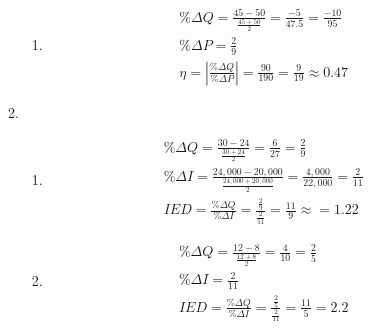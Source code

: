 \documentclass{article}
\begin{document}
\begin{enumerate}
\begin{enumerate}
\begin{enumerate}
		\item
		\begin{gather*}
		\% \Delta Q = \frac{45 - 50}{\frac{45 + 50}{2}} = \frac{-5}{47.5} = \frac{-10}{95} \\
		\% \Delta P = \frac{2}{9} \\
		\eta = \left| \frac{\% \Delta Q}{\% \Delta P} \right| = \frac{90}{190} = \frac{9}{19} \approx 0.47
		\end{gather*}
		
		\end{enumerate}
	
	\item
	
		\begin{enumerate}
		
		\item
		\begin{gather*}
		\% \Delta Q = \frac{30 - 24}{\frac{30 + 24}{2}} = \frac{6}{27} = \frac{2}{9} \\
		\% \Delta I = \frac{24,000 - 20,000}{\frac{24,000 + 20,000}{2}} = \frac{4,000}{22,000} = \frac{2}{11} \\
		IED = \frac{\% \Delta Q}{\% \Delta I} = \frac{\frac{2}{9}}{\frac{2}{11}} = \frac{11}{9} \approx = 1.22
		\end{gather*}
		
		\item
		\begin{gather*}
		\% \Delta Q = \frac{12 - 8}{\frac{12 + 8}{2}} = \frac{4}{10} = \frac{2}{5} \\
		\% \Delta I = \frac{2}{11} \\
		IED = \frac{\% \Delta Q}{\% \Delta I} = \frac{\frac{2}{5}}{\frac{2}{11}} = \frac{11}{5} = 2.2
		\end{gather*}
		
		\end{enumerate}
	
	\end{enumerate}

\end{enumerate}
\end{document}
